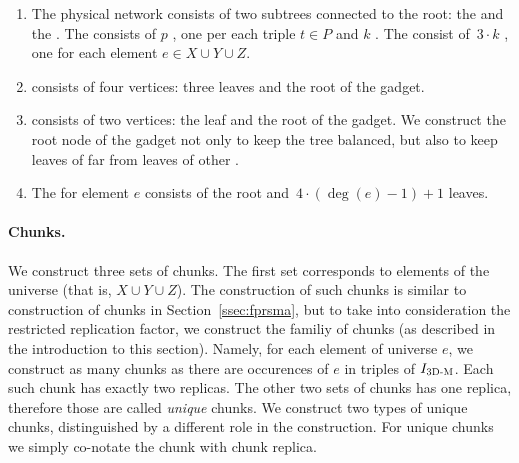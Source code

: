 \begin{enumerate}
  \item The physical network consists of two subtrees connected to the
  root: the {\MatchSubtree} and the {\CoverSubtree}. The
  {\MatchSubtree} consists of $p$ {\TripleGadgets}, one per each triple $t\in P$ and $k$
  {\UnqGadgets}. The {\CoverSubtree} consist of~$3\cdot k$ {\ElGadgets}, one for each element $e\in X\cup Y\cup Z$.
  \item {\TripleGadget} consists of four vertices: three leaves and the root of the gadget.
  \item {\UnqGadget} consists of two vertices: the leaf and the root of the gadget.
  We construct the root node of the gadget not only to keep the tree balanced, but also to keep leaves of
  {\UnqGadgets} far from leaves of other \UnqGadgets.%
  \item The {\ElGadget} for element $e$ consists of the
  root and~$4\cdot(\deg(e)-1)+1$ leaves.
\end{enumerate}

\paragraph{Chunks.}
We construct three sets of chunks.
The first set corresponds to elements of the universe (that is, $X\cup Y\cup Z$).
The construction of such chunks is similar to construction of chunks in Section~\ref{ssec:fprsma}, but to take into consideration the restricted replication factor, we construct the familiy of chunks (as described in the introduction to this section).
Namely, for each element of universe $e$, we construct as many chunks as there are occurences of $e$ in triples of $I_{\mathrm{\textsc{3D-M}}}$.
Each such chunk has exactly two replicas.
The other two sets of chunks has one replica, therefore those are called \emph{unique} chunks.
We construct two types of unique chunks, distinguished by a different role in the construction.
For unique chunks we simply co-notate the chunk with chunk replica.

